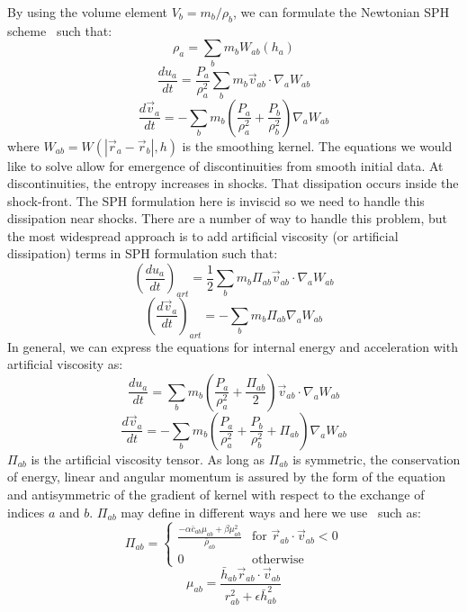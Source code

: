 By using the volume element $V_b = m_b / \rho_b$, we can formulate the Newtonian SPH scheme~\cite{rosswog2009} such that:
\begin{equation}
\label{eq:rho}
\rho_a = \sum_b m_b W_{ab} (h_a)
\end{equation}
\begin{equation}
\frac{d u_a}{dt} = \frac{P_a}{\rho_a^2} \sum_b m_b \vec{v}_{ab} \cdot \nabla_a W_{ab} 
\end{equation}
\begin{equation}
\frac{d \vec{v}_a}{d t} = - \sum_b m_b \left(\frac{P_a}{\rho_a^2} + \frac{P_b}{\rho_b^2} \right) \nabla_a W_{ab}
\end{equation}
where $W_{ab} = W(| \vec{r}_a - \vec{r}_b |,h)$ is the smoothing kernel. 
The equations we would like to solve allow for emergence of discontinuities from smooth initial data. 
At discontinuities, the entropy increases in shocks. That dissipation occurs inside the shock-front. 
The SPH formulation here is inviscid so we need to handle this dissipation near shocks. 
There are a number of way to handle this problem, but the most widespread approach is to add artificial viscosity (or artificial dissipation) terms in SPH formulation such that:
\begin{equation}
\left(\frac{d u_a}{dt} \right)_{art} = \frac{1}{2} \sum_b m_b \Pi_{ab} \vec{v}_{ab} \cdot \nabla_a W_{ab}
\end{equation}
\begin{equation}
\left(\frac{d\vec{v}_a}{dt} \right)_{art} = - \sum_b m_b \Pi_{ab}\nabla_a W_{ab}
\end{equation}
In general, we can express the equations for internal energy and acceleration with artificial viscosity as:
\begin{equation}
\label{eq:intern}
\frac{d u_a}{dt} = \sum_b m_b \left(\frac{P_a}{\rho_a^2} + \frac{\Pi_{ab}}{2} \right) \vec{v}_{ab} \cdot \nabla_a W_{ab}
\end{equation}
\begin{equation}
\label{eq:velo}
\frac{d \vec{v}_a}{d t} = - \sum_b m_b \left(\frac{P_a}{\rho_a^2} + \frac{P_b}{\rho_b^2} + \Pi_{ab} \right) \nabla_a W_{ab}
\end{equation}
$\Pi_{ab}$ is the artificial viscosity tensor. 
As long as $\Pi_{ab}$ is symmetric, the conservation of energy, linear and angular momentum is assured by the form of the equation and antisymmetric of the gradient of kernel with respect to the exchange of indices $a$ and $b$. $\Pi_{ab}$ may define in different ways and here we use~\cite{Monaghan1983} such as: 
\begin{equation}
\Pi_{ab} = \begin{cases}
\frac{- \alpha \bar{c}_{ab} \mu_{ab} + \beta \mu_{ab}^2}{\bar{\rho}_{ab}} & \text{for $\vec{r}_{ab} \cdot \vec{v}_{ab} < 0$} \\
0 & \text{otherwise}
\end{cases}
\end{equation}
\begin{equation}
\mu_{ab} = \frac{\bar{h}_{ab} \vec{r}_{ab} \cdot \vec{v}_{ab}}{r^2_{ab} + \epsilon \bar{h}_{ab}^2}
\end{equation}

